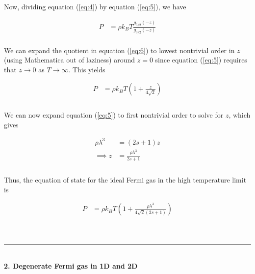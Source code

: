 \documentclass[]{article}
\begin{document}
Now, dividing equation (\ref{eq:4}) by equation (\ref{eq:5}), we have

\begin{equation}\label{eq:6}
\begin{aligned}
P & = \rho k_B T \frac{ g_{5/2}(-z) }{ g_{3/2}(-z) }
\end{aligned}
\end{equation} \\

We can expand the quotient in equation (\ref{eq:6}) to lowest nontrivial order in $z$ (using Mathematica out of laziness) around $z=0$ since equation (\ref{eq:5}) requires that $z\to 0$ as $T \to \infty$. This yields


\begin{equation}\label{eq:7}
\begin{aligned}
P & = \rho k_B T \left(  1 + \frac{z}{4\sqrt{2}} \right) \\
\end{aligned}
\end{equation} \\

We can now expand equation (\ref{eq:5}) to first nontrivial order to solve for $z$, which gives

\begin{equation}\label{eq:8}
\begin{aligned}
\rho\lambda^3  & =  (2s +1 ) z \\
\implies z & = \frac{ \rho\lambda^3 }{2s + 1} \\
\end{aligned}
\end{equation} \\

Thus, the equation of state for the ideal Fermi gas in the high temperature limit is

\begin{equation}\label{eq:9}
\begin{aligned}
P & = \rho k_B T \left(  1 + \frac{\rho\lambda^3}{4\sqrt{2} ( 2s + 1)}  \right) \\
\end{aligned}
\end{equation} 

\hfill \\
\noindent\rule{15cm}{0.4pt} \\

{\bf 2. Degenerate Fermi gas in 1D and 2D} \\
\end{document}

